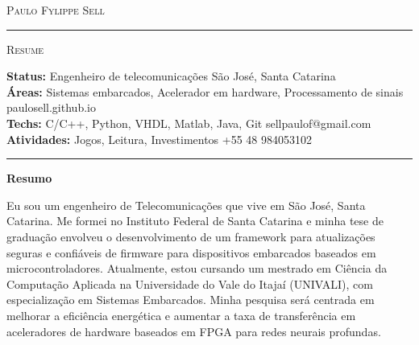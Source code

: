 \documentclass[10pt,A4]{article}
\newcommand{\cvsection}[1]
{
	\begin{center}
		\large\textcolor{sectcol}{\textbf{#1}}
	\end{center}
}
\newcommand{\metasection}[2]
{
\footnotesize{#2} \hspace*{\fill} \footnotesize{#1}\\[1pt]
}
\begin{document}
\pagestyle{fancy}	








\vspace{-8pt}
\begin{center}
	\HUGE \textsc{Paulo Fylippe Sell} \textcolor{sectcol}{\rule[-1mm]{1mm}{0.9cm}} \textsc{Resume}\\[2pt]
	
\end{center}



\vspace{6pt}


\metasection{São José, Santa Catarina}{\textbf{Status:} Engenheiro de telecomunicações}
\metasection{paulosell.github.io}{\textbf{Áreas:} 
Sistemas embarcados, Acelerador em hardware, Processamento de sinais}
\metasection{sellpaulof@gmail.com}{\textbf{Techs:} C/C++, Python, VHDL, Matlab, Java, Git}
\metasection{+55 48 984053102}{\textbf{Atividades:} Jogos, Leitura, Investimentos}
\vspace{-2pt}
\textcolor{softcol}{\hrule}
\vspace{6pt}

\normalsize

\vspace{-6pt}
\cvsection{Resumo}
Eu sou um engenheiro de Telecomunicações que vive em São José, Santa Catarina. Me formei no Instituto Federal de Santa Catarina e minha tese de graduação envolveu o desenvolvimento de um framework para atualizações seguras e confiáveis de firmware para dispositivos embarcados baseados em microcontroladores. Atualmente, estou cursando um mestrado em Ciência da Computação Aplicada na Universidade do Vale do Itajaí (UNIVALI), com especialização em Sistemas Embarcados. Minha pesquisa será centrada em melhorar a eficiência energética e aumentar a taxa de transferência em aceleradores de hardware baseados em FPGA para redes neurais profundas.\\
\end{document}
